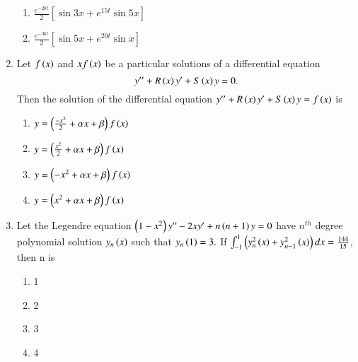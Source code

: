\documentclass[journal,12pt,onecolumn]{IEEEtran}
\theoremstyle{remark}
\begin{document}
\begin{enumerate}
\begin{enumerate}
    \item $\frac{e^{-20t}}{2}[\sin 3x+e^{15t}\sin 5x]$
    \item $\frac{e^{-36t}}{2}[\sin 5x+e^{20t}\sin x]$
\end{enumerate}
    \item Let $f\left(x\right)$ and $xf\left(x\right)$ be a particular solutions of a differential equation $$y''+R\left(x\right)y^{\prime}+S\left(x\right)y=0.$$ Then the solution of the differential equation $y''+R\left(x\right)y^{\prime}+S\left(x\right)y=f\left(x\right)$ is
    \begin{enumerate}
        \item $y=\left(\frac{-x^2}{2}+\alpha x+\beta\right)f\left(x\right)$
        \item $y=\left(\frac{x^2}{2}+\alpha x+\beta\right)f\left(x\right)$
        \item $y=\left({-x^2}+\alpha x+\beta\right)f\left(x\right)$
        \item $y=\left({x^2}+\alpha x+\beta\right)f\left(x\right)$
    \end{enumerate}
    \item Let the Legendre equation $\left(1-x^2\right)y"-2xy^{\prime}+n\left(n+1\right)y=0$ have $n^{th}$ degree polynomial solution $y_n\left(x\right)$ such that $y_n\left(1\right)=3.$ If $\int_{-1}^{1}\left(y^2_n\left(x\right)+y^2_{n-1}\left(x\right)\right)dx=\frac{144}{15}$, then n is
    \begin{enumerate}
        \item 1
        \item 2
        \item 3
        \item 4
    \end{enumerate}
\end{enumerate}
\end{document}
